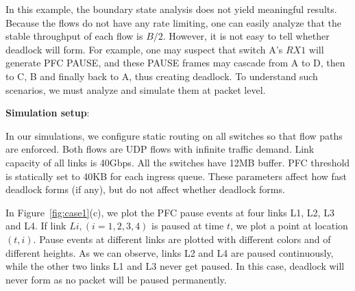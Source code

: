 In this example, the boundary state analysis does not yield meaningful
results. Because the flows do not have any rate limiting, one can easily analyze that the
stable throughput of each flow is $B/2$. However, it is not easy to tell whether deadlock
will form. For example, one may suspect that switch A's $RX1$ will generate PFC PAUSE, and
these PAUSE frames may cascade from A to D, then to C, B and finally back to A, thus creating deadlock.
To understand such scenarios, we must analyze and simulate them at packet level.




%
 
  \textbf{Simulation setup}: 

In our simulations, we configure static routing on all switches so that flow paths are enforced.
Both flows are UDP flows with infinite traffic demand. Link capacity of
all links is 40Gbps. All the switches have 12MB buffer. PFC threshold is statically set to 40KB for
each ingress queue. These parameters affect how fast deadlock forms (if any), but do not affect whether deadlock forms.

In Figure~\ref{fig:case1}(c), we plot the PFC pause events at four links L1, L2, L3 and L4.
If link $Li, (i=1,2,3,4)$ is paused at time $t$, we plot a point at location $(t, i)$. Pause events at
different links are plotted with different colors and of different heights. As we can observe, links
L2 and L4 are paused continuously, while the other two links L1 and L3 never get paused. In this case,
deadlock will never form as no packet will be paused permanently.

